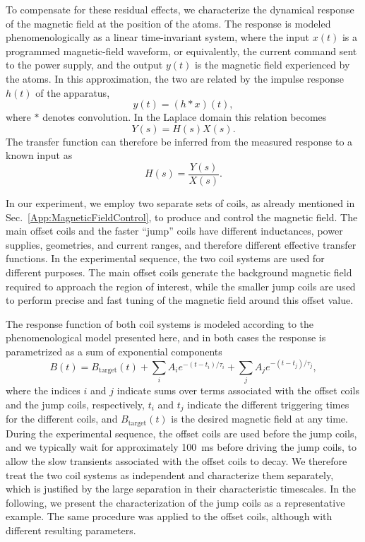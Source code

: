 To compensate for these residual effects, we characterize the dynamical response of the magnetic field at the position of the atoms. The response is modeled phenomenologically as a linear time-invariant system, where the input $x(t)$ is a programmed magnetic-field waveform, or equivalently, the current command sent to the power supply, and the output $y(t)$ is the magnetic field experienced by the atoms. In this approximation, the two are related by the impulse response $h(t)$ of the apparatus,
\begin{equation}
	y(t) = (h*x)(t),
		\label{eq:convolution}
\end{equation}
where $*$ denotes convolution. In the Laplace domain this relation becomes
\begin{equation}
	Y(s)=H(s)X(s).
		\label{eq:laplacedomain}
\end{equation}
The transfer function can therefore be inferred from the measured response to a known input as
\begin{equation}
	H(s)=\frac{Y(s)}{X(s)}.
	\label{eq:transferFunc}
\end{equation}

In our experiment, we employ two separate sets of coils, as already mentioned in Sec.~\ref{App:MagneticFieldControl}, to produce and control the magnetic field. The main offset coils and the faster ``jump'' coils have different inductances, power supplies, geometries, and current ranges, and therefore different effective transfer functions. In the experimental sequence, the two coil systems are used for different purposes. The main offset coils generate the background magnetic field required to approach the region of interest, while the smaller jump coils are used to perform precise and fast tuning of the magnetic field around this offset value. 

The response function of both coil systems is modeled according to the phenomenological model presented here, and in both cases the response is parametrized as a sum of exponential components
\begin{equation}
	B(t)=B_{\mathrm{target}}(t)+\sum_i A_i e^{-(t-t_i)/\tau_i}+\sum_j A_j e^{-(t-t_j)/\tau_j},
\end{equation}
where the indices $i$ and $j$ indicate sums over terms associated with the offset coils and the jump coils, respectively, $t_i$ and  $t_j$ indicate the different triggering times for the different coils, and $B_{\mathrm{target}}(t)$ is the desired magnetic field at any time. During the experimental sequence, the offset coils are used before the jump coils, and we typically wait for approximately \SI{100}{ms} before driving the jump coils, to allow the slow transients associated with the offset coils to decay. We therefore treat the two coil systems as independent and characterize them separately, which is justified by the large separation in their characteristic timescales. In the following, we present the characterization of the jump coils as a representative example. The same procedure was applied to the offset coils, although with different resulting parameters.

